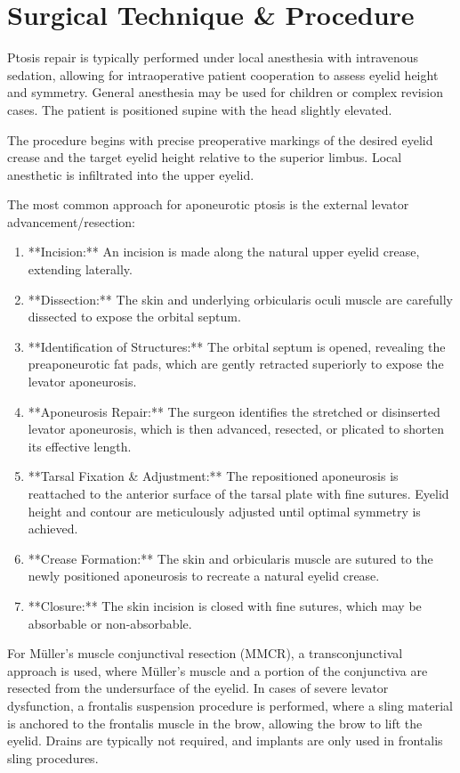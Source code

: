 \section*{Surgical Technique \& Procedure}
Ptosis repair is typically performed under local anesthesia with intravenous sedation, allowing for intraoperative patient cooperation to assess eyelid height and symmetry. General anesthesia may be used for children or complex revision cases. The patient is positioned supine with the head slightly elevated.

The procedure begins with precise preoperative markings of the desired eyelid crease and the target eyelid height relative to the superior limbus. Local anesthetic is infiltrated into the upper eyelid.

The most common approach for aponeurotic ptosis is the external levator advancement/resection:

\begin{enumerate}
  \item **Incision:** An incision is made along the natural upper eyelid crease, extending laterally.
  \item **Dissection:** The skin and underlying orbicularis oculi muscle are carefully dissected to expose the orbital septum.
  \item **Identification of Structures:** The orbital septum is opened, revealing the preaponeurotic fat pads, which are gently retracted superiorly to expose the levator aponeurosis.
  \item **Aponeurosis Repair:** The surgeon identifies the stretched or disinserted levator aponeurosis, which is then advanced, resected, or plicated to shorten its effective length.
  \item **Tarsal Fixation \& Adjustment:** The repositioned aponeurosis is reattached to the anterior surface of the tarsal plate with fine sutures. Eyelid height and contour are meticulously adjusted until optimal symmetry is achieved.
  \item **Crease Formation:** The skin and orbicularis muscle are sutured to the newly positioned aponeurosis to recreate a natural eyelid crease.
  \item **Closure:** The skin incision is closed with fine sutures, which may be absorbable or non-absorbable.
\end{enumerate}

For M\"uller's muscle conjunctival resection (MMCR), a transconjunctival approach is used, where M\"uller's muscle and a portion of the conjunctiva are resected from the undersurface of the eyelid. In cases of severe levator dysfunction, a frontalis suspension procedure is performed, where a sling material is anchored to the frontalis muscle in the brow, allowing the brow to lift the eyelid. Drains are typically not required, and implants are only used in frontalis sling procedures.

